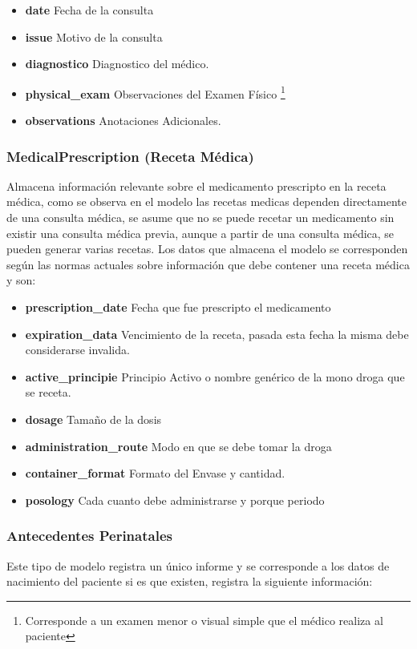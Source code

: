 \begin{itemize}
    \item \textbf{date} Fecha de la consulta
    \item \textbf{issue} Motivo de la consulta
    \item \textbf{diagnostico} Diagnostico del médico.
    \item \textbf{physical\_exam} Observaciones del Examen Físico \footnote{Corresponde a un examen menor o visual simple que el médico realiza al paciente}
    \item \textbf{observations} Anotaciones Adicionales. 
\end{itemize}

\subsubsection{MedicalPrescription (Receta Médica)}

Almacena información relevante sobre el medicamento prescripto en la receta médica, como se observa en el modelo las recetas medicas dependen directamente de una consulta médica, se asume que no se puede recetar un medicamento sin existir una consulta médica previa, aunque a partir de una consulta médica, se pueden generar varias recetas. Los datos que almacena el modelo se corresponden según las normas actuales sobre información que debe contener una receta médica y son:

\begin{itemize}
    \item \textbf{prescription\_date} Fecha que fue prescripto el medicamento
    \item \textbf{expiration\_data} Vencimiento de la receta, pasada esta fecha la  misma debe considerarse invalida.
    \item \textbf{active\_principie} Principio Activo o nombre genérico de la mono droga que se receta.
    \item \textbf{dosage} Tamaño de la dosis
    \item \textbf{administration\_route} Modo en que se debe tomar la droga
    \item \textbf{container\_format} Formato del Envase y cantidad.
    \item \textbf{posology} Cada cuanto debe administrarse y porque periodo
\end{itemize}

\subsubsection{Antecedentes Perinatales}
Este tipo de modelo registra un único informe y se corresponde a los datos de nacimiento del paciente si es que existen, registra la siguiente información:


